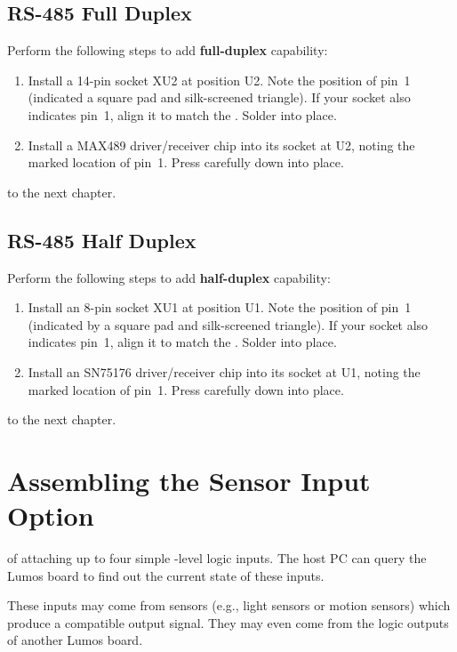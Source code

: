 \documentclass[letterpaper,twoside,onecolumn,openright,final]{memoir}
\begin{document}
\section{RS-485 Full Duplex}
Perform the following steps to add {\bfseries full-duplex}  capability:
\begin{enumerate}
\item
	Install a 14-pin  socket XU2 at position U2.  Note the position of pin~1 (indicated
        a square pad and silk-screened triangle).  If your socket also indicates pin~1, align
	it to match the . Solder into place.
\item	Install a MAX489 driver/receiver chip into its socket at U2, noting the marked location
	of pin~1.  Press carefully down into place.
\end{enumerate}

\bigskip{} to the next chapter.

\section{RS-485 Half Duplex}
Perform the following steps to add {\bfseries half-duplex}  capability:
\begin{enumerate}
\item	Install an 8-pin  socket XU1 at position U1.  Note the position of pin~1 (indicated
	by a square pad and silk-screened triangle).  If your socket also indicates pin~1, align
	it to match the . Solder into place.
\item	Install an SN75176 driver/receiver chip into its socket at U1, noting the marked location
	of pin~1.  Press carefully down into place.
\end{enumerate}

\bigskip{} to the next chapter.

\chapter{Assembling the Sensor Input Option}\label{ch:sensor-in}
 of attaching up to four simple -level
logic inputs.  The host PC can query the Lumos board to find out the current state of these
inputs.  %

These inputs may come from sensors (e.g., light sensors or motion sensors) which produce a compatible
output signal.  They may even come from the logic outputs of another Lumos board.
\end{document}
